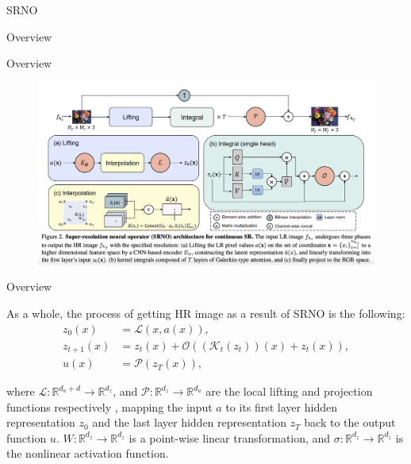 \documentclass{beamer}
\begin{document}
\begin{section}{SRNO}
\begin{frame}{Overview}
    \end{frame}

    \begin{frame}{Overview}
    \begin{figure}[H]
        \centering
        \includegraphics[width=\linewidth]{1.png}
        \label{fig:SRNO architecture}
    \end{figure}
        
    \end{frame}

    \begin{frame}{Overview}
    \begin{block}{}
    As a whole, the process of getting HR image as a result of SRNO is the following:
    \begin{align*}
 z_0(x) &= \mathcal{L}(x,a(x)), \label{lifing}  \\
 z_{t+1}(x) &= z_t(x)+\mathcal{O}((\mathcal{K}_t(z_t))(x) + z_t(x)),\label{iterative} \\
 u(x) &= \mathcal{P}(z_T(x)),
    \end{align*}
    
    where $\mathcal{L}: \mathbb{R}^{d_a+d} \rightarrow \mathbb{R}^{d_z}$, and $\mathcal{P}: \mathbb{R}^{d_z} \rightarrow \mathbb{R}^{d_u}$ are the local lifting and projection functions respectively , mapping the input $a$ to its first layer hidden representation $z_0$ and the last layer hidden representation $z_T$ back to the output function $u$. $W: \mathbb{R}^{d_z} \rightarrow \mathbb{R}^{d_z}$ is a point-wise linear transformation, and $ \sigma: \mathbb{R}^{d_z} \rightarrow \mathbb{R}^{d_z}$ is the nonlinear activation function.

    \end{block}
        
    \end{frame}

\end{section}
\end{document}
